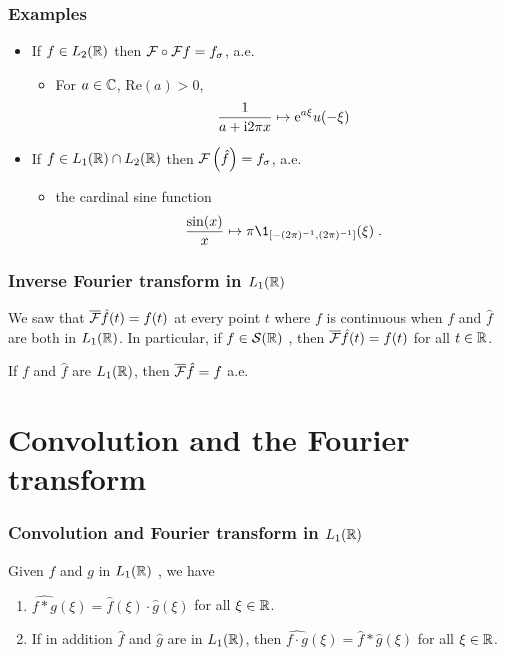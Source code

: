 \begin{frame}
\frametitle{Examples}
\begin{itemize}
\item If $f \in L_2(\mathbb{R})$ then $\mathcal{F} \circ \mathcal{F} f= f_\sigma$, a.e.
\begin{itemize}
\item  For $a \in \mathbb{C}$, $\mathrm{Re}(a) > 0$,
\[
\frac{1}{a+ \mathrm{i} 2 \pi x} \mapsto \mathrm{e}^{a \xi} u(-\xi)
\]
\end{itemize}
\item If $f \in L_1(\mathbb{R}) \cap L_2(\mathbb{R})$ then $\mathcal{F}\left( \hat{f} \right)= f_\sigma$, a.e.
\begin{itemize}
\item  the cardinal sine function
\[
\frac{\sin(x)}{x} \mapsto \pi \1_{\ccint{-(2\pi)^{-1},(2\pi)^{-1}}}(\xi) \eqsp.
\]
\end{itemize}
\end{itemize}
\end{frame}

\begin{frame}
\frametitle{Inverse Fourier transform in $L_1(\mathbb{R})$}
We saw  that $\overline{\mathcal{F}} \hat{f}(t)=f(t)$ at every point $t$ where $f$ is continuous when $f$ and $\hat{f}$  are both in $L_1(\mathbb{R})$. In particular, if $ f\in \mathcal{S}(\mathbb{R})$ , then $\overline{\mathcal{F}} \hat{f}(t)=f(t)$ for all $ t\in \mathbb{R}$.

\begin{theorem}
If $f$ and $\hat{f}$ are $L_1(\mathbb{R})$, then $\overline{\mathcal{F}} \hat{f}=f$ a.e.
\end{theorem}
\end{frame}

\section{Convolution and the Fourier transform}
\begin{frame}
\frametitle{Convolution and Fourier transform in $L_1(\mathbb{R})$}
\begin{theorem}
Given $f$ and $g$ in $L_1(\mathbb{R})$ , we have
\begin{enumerate}[label=(\roman*)]
\item $\widehat{f*g}(\xi)=\hat{f}(\xi)\cdot\hat{g}(\xi)$  for all $\xi \in \mathbb{R}$.
\item If in addition $\hat{f}$ and $\hat{g}$ are in $L_1(\mathbb{R})$, then
$\widehat{f\cdot g}(\xi)=\hat{f}*\hat{g}(\xi)$ for all $\xi\in \mathbb{R}$.
\end{enumerate}
\end{theorem}

\end{frame}

